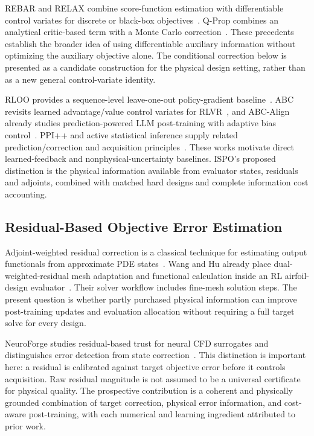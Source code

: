 REBAR and RELAX combine score-function estimation with differentiable control variates for discrete or black-box objectives~\cite{tucker2017rebar,grathwohl2018relax}. Q-Prop combines an analytical critic-based term with a Monte Carlo correction~\cite{gu2017qprop}. These precedents establish the broader idea of using differentiable auxiliary information without optimizing the auxiliary objective alone. The conditional correction below is presented as a candidate construction for the physical design setting, rather than as a new general control-variate identity.


RLOO provides a sequence-level leave-one-out policy-gradient baseline~\cite{ahmadian2024rloo}. ABC revisits learned advantage/value control variates for RLVR~\cite{pan2026abc}, and ABC-Align already studies prediction-powered LLM post-training with adaptive bias control~\cite{frankel2026abcalign}. PPI++ and active statistical inference supply related prediction/correction and acquisition principles~\cite{angelopoulos2024ppipp,zrnic2024active}. These works motivate direct learned-feedback and nonphysical-uncertainty baselines. ISPO's proposed distinction is the physical information available from evaluator states, residuals and adjoints, combined with matched hard designs and complete information cost accounting.

\subsection{Residual-Based Objective Error Estimation}
Adjoint-weighted residual correction is a classical technique for estimating output functionals from approximate PDE states~\cite{pierce2000adjoint}. Wang and Hu already place dual-weighted-residual mesh adaptation and functional calculation inside an RL airfoil-design evaluator~\cite{wang2024mechanism}. Their solver workflow includes fine-mesh solution steps. The present question is whether partly purchased physical information can improve post-training updates and evaluation allocation without requiring a full target solve for every design.

NeuroForge studies residual-based trust for neural CFD surrogates and distinguishes error detection from state correction~\cite{jabbary2026neuroforge}. This distinction is important here: a residual is calibrated against target objective error before it controls acquisition. Raw residual magnitude is not assumed to be a universal certificate for physical quality. The prospective contribution is a coherent and physically grounded combination of target correction, physical error information, and cost-aware post-training, with each numerical and learning ingredient attributed to prior work.


